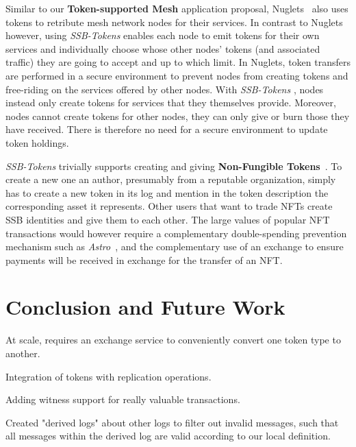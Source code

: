 \documentclass[sigplan,screen,10pt]{acmart}
\newcommand\ssbtokens[0]{\textit{SSB-Tokens} }
\begin{document}
Similar to our \textbf{Token-supported Mesh} application proposal, Nuglets~\cite{buttyan2001nuglets} also uses tokens to retribute mesh network nodes for their services. In contrast to Nuglets however, using \ssbtokens enables each node to emit tokens for their own services and individually choose whose other nodes' tokens (and associated traffic) they are going to accept and up to which limit. In Nuglets, token transfers are performed in a secure environment to prevent nodes from creating tokens and free-riding on the services offered by other nodes. With \ssbtokens, nodes instead only create tokens for services that they themselves provide. Moreover, nodes cannot create tokens for other nodes, they can only give or burn those they have received. There is therefore no need for a secure environment to update token holdings. 

\ssbtokens trivially supports creating and giving \textbf{Non-Fungible Tokens}~\cite{nft-survey}. To create a new one an author, presumably from a reputable organization, simply has to create a new token in its log and mention in the token description the corresponding asset it represents. Other users that want to trade NFTs create SSB identities and give them to each other. The large values of popular NFT transactions would however require a complementary double-spending prevention mechanism such as \textit{Astro}~\cite{collins2020online}, and the complementary use of an exchange to ensure payments will be received in exchange for the transfer of an NFT.

\section{Conclusion and Future Work}
\label{section:conclusion}

At scale, requires an exchange service to conveniently convert one token type to another.

Integration of tokens with replication operations.

Adding witness support for really valuable transactions.

Created "derived logs" about other logs to filter out invalid messages, such that all messages within the derived log are valid according to our local definition.
\end{document}
